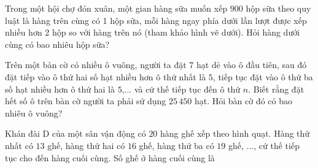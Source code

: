 \begin{ex}%
	Trong một hội chợ đón xuân, một gian hàng sữa muốn xếp $900$ hộp sữa theo quy luật là hàng trên cùng có 1 hộp sữa, mỗi hàng ngay phía dưới  lần lượt được xếp nhiều hơn 2 hộp so với hàng trên nó (tham khảo hình vẽ dưới). Hỏi hàng dưới cùng có bao nhiêu hộp sữa?
\end{ex}

\begin{ex}%
	Trên một bàn cờ có nhiều ô vuông, người ta đặt $7$ hạt dẻ vào ô đầu tiên, sau đó đặt tiếp vào ô thứ hai số hạt nhiều hơn ô  thứ nhất là $5$, tiếp tục đặt vào ô thứ ba số hạt nhiều hơn ô thứ hai là $5$,... và cứ thế tiếp tục đến ô thứ $n$. Biết rằng đặt hết số ô trên bàn cờ người ta phải sử dụng $25\,450$ hạt. Hỏi bàn cờ đó có bao nhiêu ô vuông?
\end{ex}

\begin{ex}%
	Khán đài D của một  sân vận động có $20$ hàng ghế xếp theo hình quạt. Hàng thứ nhất có $13$ ghế, hàng thứ hai có $16$ ghế, hàng thứ ba có $19$ ghế, $\ldots$, cứ thế tiếp tục cho đến hàng cuối cùng. Số ghế ở hàng cuối cùng là
\end{ex}

